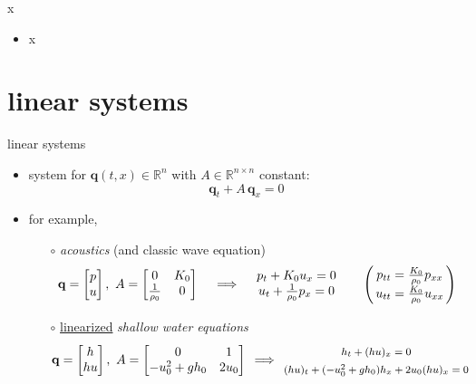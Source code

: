 \documentclass[10pt,hyperref]{beamer}
\newcommand{\bq}{\mathbf{q}}
\newcommand{\RR}{\mathbb{R}}
\begin{document}
\begin{frame}{x}

\begin{itemize}
\item x
\end{itemize}
\end{frame}


\section{linear systems}

\begin{frame}{linear systems}

\begin{itemize}
\item system for $\bq(t,x) \in \RR^n$ with $A\in\RR^{n\times n}$ constant:
  $$\bq_t + A\, \bq_x=0$$
\item for example,
    \begin{itemize}
    \item[$\circ$] \emph{acoustics} (and classic wave equation)
        $$\bq = \begin{bmatrix} p \\ u \end{bmatrix}, \,\, A = \begin{bmatrix} 0 & K_0 \\ \frac{1}{\rho_0} & 0 \end{bmatrix} \quad \implies \quad \begin{matrix} p_t + K_0 u_x = 0 \\ u_t + \frac{1}{\rho_0} p_x = 0 \end{matrix} \qquad \begin{pmatrix} \, {\large \strut} p_{tt} = \frac{K_0}{\rho_0} p_{xx}\, \\ \, {\large \strut} u_{tt} = \frac{K_0}{\rho_0} u_{xx}\, \end{pmatrix}$$
    \item[$\circ$] \underline{linearized} \emph{shallow water equations}
        $$\bq = \begin{bmatrix} h \\ h u \end{bmatrix}, \,\, A = \begin{bmatrix} 0 & 1 \\ -u_0^2+gh_0 & 2 u_0 \end{bmatrix} \, \implies \, {\footnotesize \begin{matrix} {\large \strut} h_t + (hu)_x = 0 \\ {\large \strut} (h u)_t + (-u_0^2+gh_0) h_x + 2u_0 (h u)_x = 0 \end{matrix} }$$

\end{itemize}
\end{itemize}
\end{frame}
\end{document}
